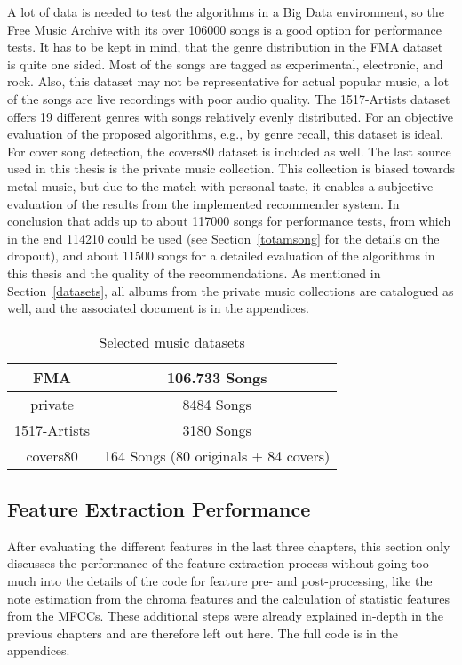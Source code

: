 A lot of data is needed to test the algorithms in a Big Data environment, so the Free Music Archive with its over 106000 songs is a good option for performance tests. It has to be kept in mind, that the genre distribution in the FMA dataset is quite one sided. Most of the songs are tagged as experimental, electronic, and rock. Also, this dataset may not be representative for actual popular music, a lot of the songs are live recordings with poor audio quality. %
The 1517-Artists dataset offers 19 different genres with songs relatively evenly distributed. For an objective evaluation of the proposed algorithms, e.g., by genre recall, this dataset is ideal. For cover song detection, the covers80 dataset is included as well.
The last source used in this thesis is the private music collection. This collection is biased towards metal music, but due to the match with personal taste, it enables a subjective evaluation of the results from the implemented recommender system.
In conclusion that adds up to about 117000 songs for performance tests, from which in the end 114210 could be used (see Section~\ref{totamsong} for the details on the dropout), and about 11500 songs for a detailed evaluation of the algorithms in this thesis and the quality of the recommendations. As mentioned in Section~\ref{datasets}, all albums from the private music collections are catalogued as well, and the associated document is in the appendices. 

\begin{table}[h]
	\label{used_dsets}
	\begin{center}
		\begin{tabular}{|c||c|}
			\hline
			FMA & 106.733 Songs\\
			\hline
			private & 8484 Songs\\
			\hline
			1517-Artists & 3180 Songs\\
			\hline
			covers80 & 164 Songs (80 originals + 84 covers)\\
			\hline
		\end{tabular}
	\end{center}
	\caption{Selected music datasets}
\end{table}
\FloatBarrier

\subsection{Feature Extraction Performance}

After evaluating the different features in the last three chapters, this section only discusses the performance of the feature extraction process without going too much into the details of the code for feature pre- and post-processing, like the note estimation from the chroma features and the calculation of statistic features from the MFCCs. These additional steps were already explained in-depth in the previous chapters and are therefore left out here. The full code is in the appendices. 

